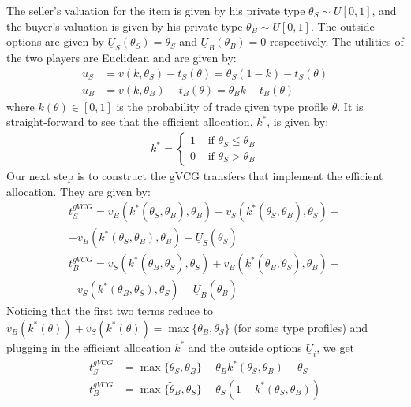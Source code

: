 \documentclass[a4paper]{article}
\begin{document}
	The seller's valuation for the item is given by his private type $\theta_S \sim U[0,1]$, and the buyer's valuation is given by his private type $\theta_B \sim U[0,1]$. The outside options are given by $\underline{U}_S({\theta}_S)={\theta}_S$ and $\underline{U}_B({\theta}_B)=0$ respectively. The utilities of the two players are Euclidean and are given by:
	\begin{align*}
		u_S &= v(k,\theta_S)-t_S(\theta)=\theta_S (1-k)-t_S(\theta)
		\\
		u_B &= v(k,\theta_B)-t_B(\theta)=\theta_B k-t_B(\theta)
	\end{align*}
	where $k(\theta) \in [0,1]$ is the probability of trade given type profile $\theta$. It is straight-forward to see that the efficient allocation, $k^*$, is given by:
	\begin{align*}
		k^*= \begin{cases}
			1 & \text{ if } \theta_S \leq \theta_B \\ 
			0 & \text{ if } \theta_S > \theta_B
		\end{cases}
	\end{align*}
	Our next step is to construct the gVCG transfers that implement the efficient allocation. They are given by:
	\begin{align*}
		t_S^{gVCG} = v_B(k^*(\tilde{\theta}_S,\theta_B),\theta_B) + v_S(k^*(\tilde{\theta}_S,\theta_B),\tilde{\theta}_S) - \\
		-v_B(k^*(\theta_S,\theta_B),\theta_B) - \underline{U}_S(\tilde{\theta}_S)
		\\
		t_B^{gVCG} = v_S(k^*(\tilde{\theta}_B,\theta_S),\theta_S) + v_B(k^*(\tilde{\theta}_B,\theta_S),\tilde{\theta}_B) - \\
		-v_S(k^*(\theta_B,\theta_S),\theta_S) - \underline{U}_B(\tilde{\theta}_B)
	\end{align*}
	Noticing that the first two terms reduce to $v_B(k^*(\theta))+v_S(k^*(\theta)) = \max \{\theta_B,\theta_S\}$ (for some type profiles) and plugging in the efficient allocation $k^*$ and the outside options $\underline{U}_i$, we get
	\begin{align*}
		t_S^{gVCG} &= \max\{\tilde{\theta}_S,\theta_B\} - \theta_B k^*(\theta_S,\theta_B) - \tilde{\theta}_S
		\\
		t_B^{gVCG} &= \max\{\tilde{\theta}_B,\theta_S\} - \theta_S \left(1 - k^*(\theta_S,\theta_B)\right)
	\end{align*}
	
\end{document}
